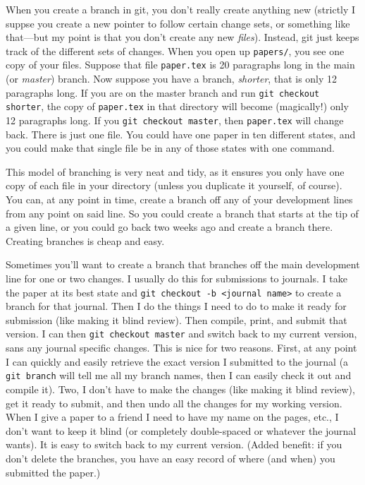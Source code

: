 \documentclass{article}
\begin{document}
When you create a branch in git, you don't really create anything
new (strictly I suppse you create a new pointer to follow certain
change sets, or something like that—but my point is that you don't
create any new \emph{files}). Instead, git just keeps track of the
different sets of changes. When you open up \verb!papers/!, you see
one copy of your files. Suppose that file \verb!paper.tex! is 20
paragraphs long in the main (or \emph{master}) branch. Now suppose
you have a branch, \emph{shorter}, that is only 12 paragraphs long.
If you are on the master branch and run
\verb!git checkout shorter!, the copy of \verb!paper.tex! in that
directory will become (magically!) only 12 paragraphs long. If you
\verb!git checkout master!, then \verb!paper.tex! will change back.
There is just one file. You could have one paper in ten different
states, and you could make that single file be in any of those
states with one command.

This model of branching is very neat and tidy, as it ensures you
only have one copy of each file in your directory (unless you
duplicate it yourself, of course). You can, at any point in time,
create a branch off any of your development lines from any point on
said line. So you could create a branch that starts at the tip of a
given line, or you could go back two weeks ago and create a branch
there. Creating branches is cheap and easy.

Sometimes you'll want to create a branch that branches off the main
development line for one or two changes. I usually do this for
submissions to journals. I take the paper at its best state and
\verb!git checkout -b <journal name>! to create a branch for that
journal. Then I do the things I need to do to make it ready for
submission (like making it blind review). Then compile, print, and
submit that version. I can then \verb!git checkout master! and
switch back to my current version, sans any journal specific
changes. This is nice for two reasons. First, at any point I can
quickly and easily retrieve the exact version I submitted to the
journal (a \verb!git branch! will tell me all my branch names, then
I can easily check it out and compile it). Two, I don't have to
make the changes (like making it blind review), get it ready to
submit, and then undo all the changes for my working version. When
I give a paper to a friend I need to have my name on the pages,
etc., I don't want to keep it blind (or completely double-spaced or
whatever the journal wants). It is easy to switch back to my
current version. (Added benefit: if you don't delete the branches,
you have an easy record of where (and when) you submitted the
paper.)
\end{document}
